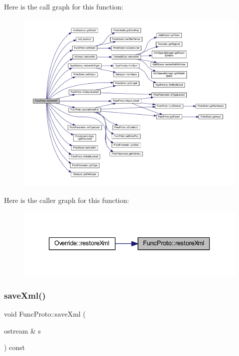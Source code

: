 Here is the call graph for this function\+:
\nopagebreak
\begin{figure}[H]
\begin{center}
\leavevmode
\includegraphics[width=350pt]{class_func_proto_a4c4f9da74ee904e6abfa195bd843521e_cgraph}
\end{center}
\end{figure}
Here is the caller graph for this function\+:
\nopagebreak
\begin{figure}[H]
\begin{center}
\leavevmode
\includegraphics[width=333pt]{class_func_proto_a4c4f9da74ee904e6abfa195bd843521e_icgraph}
\end{center}
\end{figure}
\mbox{\label{class_func_proto_a4da5ce755480a4eded9bedff2c6e274f}} 
\subsubsection{\texorpdfstring{saveXml()}{saveXml()}}
{\footnotesize\ttfamily void Func\+Proto\+::save\+Xml (\begin{DoxyParamCaption}\item[{ostream \&}]{s }\end{DoxyParamCaption}) const}



